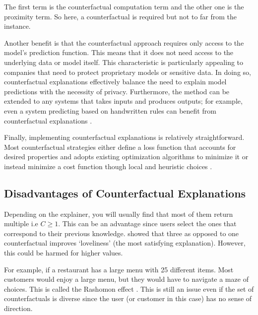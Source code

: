 The first term is the counterfactual computation term and the other one is the proximity term. So here, a counterfactual is required but not to far from the instance.

Another benefit is that the counterfactual approach requires only access to the model’s prediction function. This means that it does not need access to the underlying data or model itself. This characteristic is particularly appealing to companies that need to protect proprietary models or sensitive data. In doing so, counterfactual explanations effectively balance the need to explain model predictions with the necessity of privacy. Furthermore, the method can be extended to any systems that takes inputs and produces outputs; for example, even a system predicting based on handwritten rules can benefit from counterfactual explanations \citep{molnar2020interpretable}.

Finally, implementing counterfactual explanations is relatively straightforward. Most counterfactual strategies either define a loss function that accounts for desired properties and adopts existing optimization algorithms to minimize it or instead minimize a cost function though local and heuristic choices \citep{guidotti2024counterfactual}.

\subsection{Disadvantages of Counterfactual Explanations}
Depending on the explainer, you will usually find that most of them return multiple i.e $C \geq 1$. This can be an advantage since users select the ones that correspond to their previous knowledge. \citet{forrest2021contrastive} showed that three as opposed to one counterfactual improves ‘loveliness’ (the most satisfying explanation). However, this could be harmed for higher values. 

For example, if a restaurant has a large menu with 25 different items. Most customers would enjoy a large menu, but they would have to navigate a maze of choices. This is called the Rashomon effect \citep{molnar2020interpretable}. This is still an issue even if the set of counterfactuals is diverse since the user (or customer in this case) has no sense of direction.

